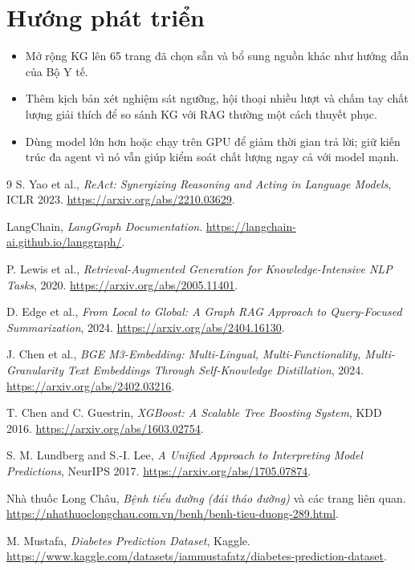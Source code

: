 \documentclass[12pt,a4paper]{report}
\begin{document}
\section{Hướng phát triển}
\begin{itemize}[leftmargin=*]
    \item Mở rộng KG lên 65 trang đã chọn sẵn và bổ sung nguồn khác như hướng dẫn của Bộ Y tế.
    \item Thêm kịch bản xét nghiệm sát ngưỡng, hội thoại nhiều lượt và chấm tay chất lượng giải
          thích để so sánh KG với RAG thường một cách thuyết phục.
    \item Dùng model lớn hơn hoặc chạy trên GPU để giảm thời gian trả lời; giữ kiến trúc đa agent vì
          nó vẫn giúp kiểm soát chất lượng ngay cả với model mạnh.
\end{itemize}

\begin{thebibliography}{9}
S. Yao et al., \emph{ReAct: Synergizing Reasoning and Acting in Language Models}, ICLR 2023.
\url{https://arxiv.org/abs/2210.03629}.

LangChain, \emph{LangGraph Documentation}.
\url{https://langchain-ai.github.io/langgraph/}.

P. Lewis et al., \emph{Retrieval-Augmented Generation for Knowledge-Intensive NLP Tasks}, 2020.
\url{https://arxiv.org/abs/2005.11401}.

D. Edge et al., \emph{From Local to Global: A Graph RAG Approach to Query-Focused Summarization}, 2024.
\url{https://arxiv.org/abs/2404.16130}.

J. Chen et al., \emph{BGE M3-Embedding: Multi-Lingual, Multi-Functionality, Multi-Granularity Text
Embeddings Through Self-Knowledge Distillation}, 2024. \url{https://arxiv.org/abs/2402.03216}.

T. Chen and C. Guestrin, \emph{XGBoost: A Scalable Tree Boosting System}, KDD 2016.
\url{https://arxiv.org/abs/1603.02754}.

S. M. Lundberg and S.-I. Lee, \emph{A Unified Approach to Interpreting Model Predictions}, NeurIPS 2017.
\url{https://arxiv.org/abs/1705.07874}.

Nhà thuốc Long Châu, \emph{Bệnh tiểu đường (đái tháo đường)} và các trang liên quan.
\url{https://nhathuoclongchau.com.vn/benh/benh-tieu-duong-289.html}.

M. Mustafa, \emph{Diabetes Prediction Dataset}, Kaggle.
\url{https://www.kaggle.com/datasets/iammustafatz/diabetes-prediction-dataset}.
\end{thebibliography}
\end{document}
